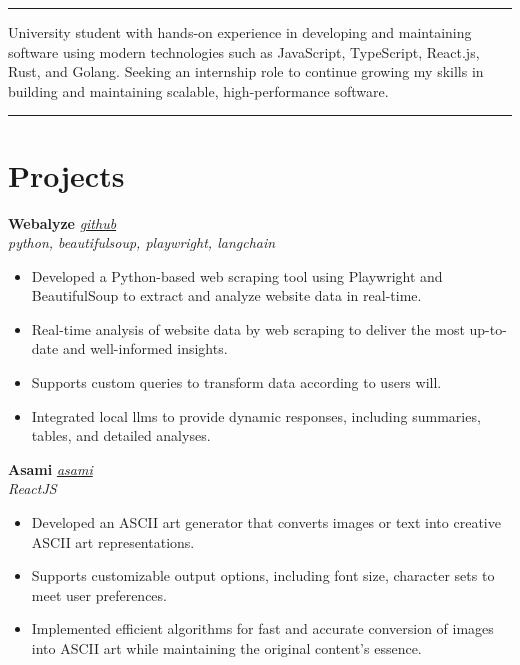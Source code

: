 \documentclass[a4paper,10pt]{article}
\begin{document}
\begin{center}
\end{center}

\vspace{3pt}
\hrule

\vspace{1pt}
University student with hands-on experience in developing and maintaining software using modern technologies such as JavaScript, TypeScript, React.js, Rust, and Golang. Seeking an internship role to continue growing my skills in building and maintaining scalable, high-performance software.
\vspace{5pt}

\hrule
\vspace{5pt}

\section*{Projects}
\textbf{Webalyze} \hfill \textit{\href{http://github.com/quantinium03/webalyze}{github}} \\
\textit{python, beautifulsoup, playwright, langchain} \\
\vspace{-15pt}
\begin{itemize}[itemsep=0pt, parsep=0pt]
    \item Developed a Python-based web scraping tool using Playwright and BeautifulSoup to extract and analyze website data in real-time.
    \item Real-time analysis of website data by web scraping to deliver the most up-to-date and well-informed insights.
    \item Supports custom queries to transform data according to users will.
    \item Integrated local llms to provide dynamic responses, including summaries, tables, and detailed analyses.
\end{itemize}

\textbf{Asami} \hfill \textit{\href{http://asami.vercel.app}{asami}} \\
\textit{ReactJS} \\
\vspace{-15pt}
\begin{itemize}[itemsep=0pt, parsep=0pt]
    \item Developed an ASCII art generator that converts images or text into creative ASCII art representations.  
    \item Supports customizable output options, including font size, character sets to meet user preferences.  
    \item Implemented efficient algorithms for fast and accurate conversion of images into ASCII art while maintaining the original content's essence.  
\end{itemize}
\end{document}
